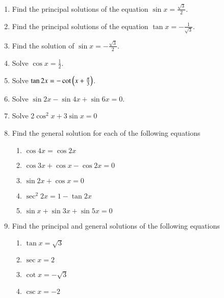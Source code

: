
\begin{enumerate}[label=\thesubsection.\arabic*.,ref=\thesubsection.\theenumi]
\item Find the principal solutions of the equation $\sin x = \frac{\sqrt 3}{2}$.
%
%
\item Find the principal solutions of the equation $\tan x = -\frac{1}{\sqrt 3}$.
%
%
\item Find the solution of $\sin x = -\frac{\sqrt 3}{2}$.
%
%
\item Solve $\cos x = \frac{1}{2}$.
%
%
\item Solve $\tan2x=-\cot\left(x+\frac{\pi}{3}\right)$.
%
\item Solve $\sin2x-\sin4x+\sin6x=0$.
%
%
\item Solve 2$\cos^{2}x+3\sin x=0$
%
\item Find the general solution for each of the following equations
\begin{enumerate}
\item $\cos4x=\cos2x$
\item $\cos3x+\cos x-\cos2x=0$
\item $\sin2x+\cos x=0$
\item $\sec^{2}2x=1-\tan2x$
\item $\sin x+\sin3x+\sin5x=0$
\end{enumerate}
%
\item Find the principal and general solutions of the following equations
\begin{enumerate}
\item $\tan x=\sqrt 3$
\item $\sec x=2$
\item $\cot x=-\sqrt 3$
\item $\csc x=-2$
\end{enumerate}
\end{enumerate}
